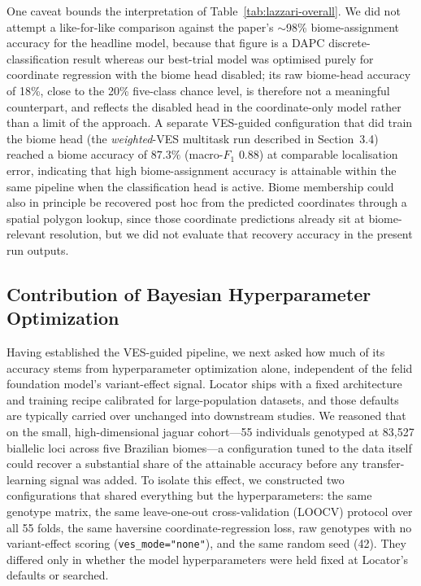 \documentclass[twocolumn,10pt]{article}
\begin{document}
One caveat bounds the interpretation of Table~\ref{tab:lazzari-overall}. We did not attempt a
like-for-like comparison against the paper's $\sim$98\% biome-assignment accuracy for the headline
model, because that figure is a DAPC discrete-classification result whereas our best-trial model was
optimised purely for coordinate regression with the biome head disabled; its raw biome-head accuracy
of 18\%, close to the 20\% five-class chance level, is therefore not a meaningful counterpart, and
reflects the disabled head in the coordinate-only model rather than a limit of the approach. A
separate VES-guided configuration that did train the biome head (the \emph{weighted}-VES multitask
run described in Section~3.4) reached a biome accuracy of $87.3\%$ (macro-$F_1$ $0.88$) at
comparable localisation error, indicating that high biome-assignment accuracy is attainable within
the same pipeline when the classification head is active. Biome membership could also in principle
be recovered post hoc from the predicted coordinates through a spatial polygon lookup, since those
coordinate predictions already sit at biome-relevant resolution, but we did not evaluate that
recovery accuracy in the present run outputs.

\subsection{Contribution of Bayesian Hyperparameter Optimization}
Having established the VES-guided pipeline, we next asked how much of its accuracy stems from
hyperparameter optimization alone, independent of the felid foundation model's variant-effect
signal. Locator \citep{battey2020predicting} ships with a fixed architecture and training recipe
calibrated for large-population datasets, and those defaults are typically carried over unchanged
into downstream studies. We reasoned that on the small, high-dimensional jaguar cohort---55
individuals genotyped at 83{,}527 biallelic loci across five Brazilian biomes---a configuration
tuned to the data itself could recover a substantial share of the attainable accuracy before any
transfer-learning signal was added. To isolate this effect, we constructed two configurations that
shared everything but the hyperparameters: the same genotype matrix, the same leave-one-out
cross-validation (LOOCV) protocol over all 55 folds, the same haversine coordinate-regression loss,
raw genotypes with no variant-effect scoring (\texttt{ves\_mode="none"}), and the same random seed
(42). They differed only in whether the model hyperparameters were held fixed at Locator's defaults
or searched.
\end{document}
